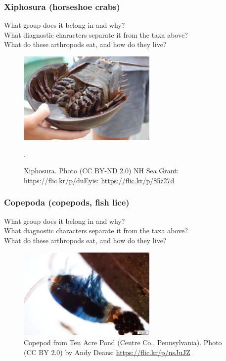 \documentclass[letterpaper, 11pt]{article}
\begin{document}
\subsubsection*{Xiphosura (horseshoe crabs)}
What group does it belong in and why?\\

\noindent{}What diagnostic characters separate it from the taxa above?\\

\noindent{}What do these arthropods eat, and how do they live?\\

\begin{figure}[ht!]
  \centering
    \includegraphics[width=0.6\textwidth]{xipho}
  \caption{Xiphosura. Photo (CC BY-ND 2.0) NH Sea Grant: https://flic.kr/p/duEyis: \url{https://flic.kr/p/85z27d}}.
  \label{fig:xipho}
\end{figure}

\subsubsection*{Copepoda (copepods, fish lice)}
What group does it belong in and why?\\

\noindent{}What diagnostic characters separate it from the taxa above?\\

\noindent{}What do these arthropods eat, and how do they live?\\

\begin{figure}[ht!]
  \centering
    \includegraphics[width=0.6\textwidth]{copepod}
  \caption{Copepod from Ten Acre Pond (Centre Co., Pennsylvania). Photo (CC BY 2.0) by Andy Deans: \url{https://flic.kr/p/nsJuJZ}}
  \label{fig:copepod}
\end{figure}
\end{document}
